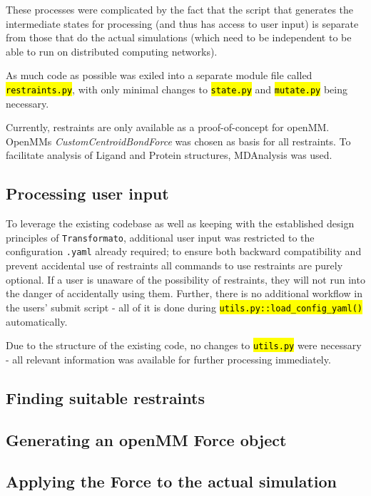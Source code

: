 \documentclass[oneside]{scrreprt}
\newcommand{\code}[1]{\texttt{\hl{#1}}}
\begin{document}
These processes were complicated by the fact that the script that generates the intermediate states for processing (and thus has access to user input) is separate from those that do the actual simulations (which need to be independent to be able to run on distributed computing networks).



 As much code as possible was exiled into a separate module file called \code{restraints.py}, with only minimal changes to \code{state.py} and \code{mutate.py} being necessary. 

Currently, restraints are only available as a proof-of-concept for openMM. OpenMMs \emph{CustomCentroidBondForce} was chosen as basis for all restraints. To facilitate analysis of Ligand and Protein structures, MDAnalysis\cite{agrawal2011,oliver_beckstein-proc-scipy-2016} was used.

\subsection{Processing user input}
To leverage the existing codebase as well as keeping with the established design principles of \texttt{Transformato}, additional user input was restricted to the configuration \texttt{.yaml} already required; to ensure both backward compatibility and prevent accidental use of restraints all commands to use restraints are purely optional. If a user is unaware of the possibility of restraints, they will not run into the danger of accidentally using them. Further, there is no additional workflow in the users' submit script - all of it is done during \code{utils.py::load\_config\_yaml()} automatically.

Due to the structure of the existing code, no changes to \code{utils.py} were necessary - all relevant information was available for further processing immediately.
\subsection{Finding suitable restraints}

\subsection{Generating an openMM Force object}

\subsection{Applying the Force to the actual simulation}
\end{document}
